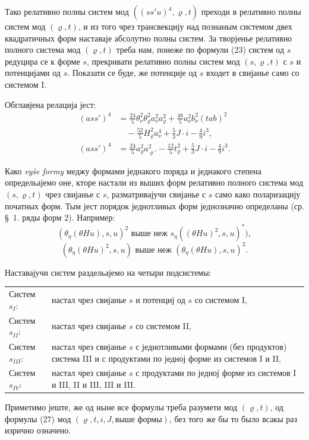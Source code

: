 ﻿\documentclass[11pt]{article}
\begin{document}
Тако релативно полны систем мод $((ss'u)^4,\varrho,t)$ преходи в релативно полны систем мод $(\varrho,t)$, и из того чрез трансвекцију над познаным системом двех квадратичных форм наставаје абсолутно полны систем. За творјенье релативно полного система мод $(\varrho,t)$ треба нам, понеже по формули (23) систем од $s$ редуцира се к форме $s$, прекривати релативно полны систем мод $(s,\varrho,t)$ с $s$ и потенцијами од $s$. Показати се буде, же потенције од $s$ входет в свијанье само со системом I.

Обглавјена релација јест:
\[
\tag{22}
\begin{aligned}
(ass')^4&=\frac{24}{5}\theta_\nu^2\theta_\varrho^2a_\nu^2a_\varrho^2+
\frac{48}{5}a_\nu^2b_\nu^2(tab)^2\\
&\quad-\frac{52}{5}H_\varrho^2a_\nu^4+
\frac53J\cdot i-\frac49i^3,\\
(ass')^4&=\frac{24}{5}a_\varrho^2a_{\varrho'}^2-
\frac{12}{5}t_\varrho^2+\frac53J\cdot i-\frac49i^3.
\end{aligned}
\]

Како \emph{vyše formy} меджу формами једнакого поряда и једнакого степена определьајемо оне, кторе настали из выших форм релативно полного система мод $(s,\varrho,t)$ чрез свијанье с $s$, разматривајучи свијанье с $s$ само како поларизацију початных форм. Тым јест порядок једнотливых форм једнозначно определаны (ср. \S\ 1. ряды форм 2). Например:
\[
(\theta_\eta(\theta Hu),s,u)^2\text{ выше неж }s_\eta((\theta Hu)^2,s,u)^*),
\]
\[
(\theta_\eta(\theta Hu)^2,s,u)\text{ выше неж }(\theta_\eta(\theta Hu),s,u)^2.
\]

Наставајучи систем раздельајемо на четыри подсистемы:

\noindent\begin{tabular}{@{}l p{}@{}}
Систем $s_I$: & настал чрез свијанье $s$ и потенциј од $s$ со системом I,\\
Систем $s_{II}$: & настал чрез свијанье $s$ со системом II,\\
Систем $s_{III}$: & настал чрез свијанье $s$ с једнотливыми формами (без продуктов) система III и с продуктами по једној форме из системов I и II,\\
Систем $s_{IV}$: & настал чрез свијанье $s$ с продуктами по једној форме из системов I и III, II и III, III и III.
\end{tabular}

\medskip

Приметимо јеште, же од ныне все формулы треба разумети мод $(\varrho,t)$, од формулы (27) мод $(\varrho,t,i,J,\text{выше формы})$, без того же бы то было всакы раз изрично означено.
\end{document}
